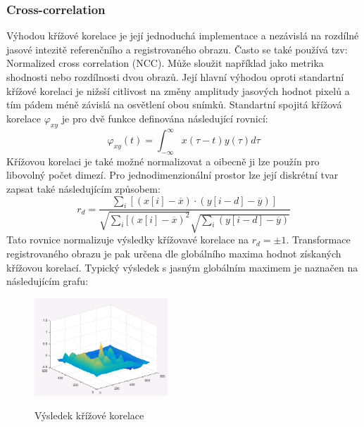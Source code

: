 \documentclass{thesis}%
\begin{document}
\subsubsection{Cross-correlation}
Výhodou křížové korelace je její jednoduchá implementace a nezávislá na rozdílné jasové intezitě referenčního a registrovaného obrazu. Často se také používá tzv: Normalized cross correlation (NCC). Může sloužit například jako metrika shodnosti nebo rozdílnosti dvou obrazů. Její hlavní výhodou oproti standartní křížové korelaci je nižsší citlivost na změny amplitudy jasových hodnot pixelů a tím pádem méně závislá na osvětlení obou snímků. Standartní spojitá křížová korelace $\varphi_{xy}$ je pro dvě funkce definována následující rovnicí:
\begin{equation}
\varphi_{xy}(t) = \int_{-\infty}^{\infty}x(\tau-t)y(\tau)d\tau
\end{equation}
Křížovou korelaci je také možné normalizovat a oibecně ji lze použín pro libovolný počet dimezí. Pro jednodimenzionální prostor lze její diskrétní tvar zapsat také následujícím způsobem:
\begin{equation}
r_d = \frac{\sum\limits_i [(x[i]-\overline{x})\cdotp (y[i-d]-\overline{y})]}{\sqrt{\sum\limits_i [(x[i]-\overline{x})^2}\sqrt{ \sum\limits_i (y[i-d]-\overline{y})}}
\end{equation}
Tato rovnice normalizuje výsledky křížovavé korelace na $r_d = \pm 1$. 
Transformace registrovaného obrazu je pak určena dle globálního maxima hodnot získaných křížovou korelací. Typický výsledek s jasným globálním maximem je naznačen na následujícím grafu:

 \begin{figure}[htp!]
  
	\centering\includegraphics[width=5cm]{cc_res.png}\\
	\caption[Výsledek křížové korelace]{Výsledek křížové korelace}
\end{figure}
\end{document}

